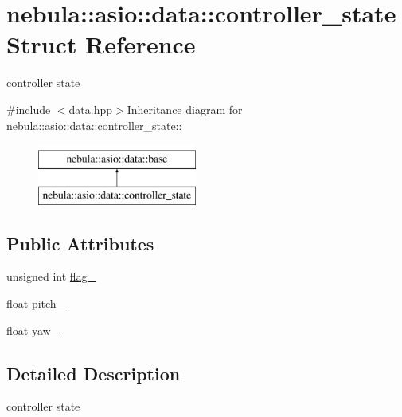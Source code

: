 \hypertarget{structnebula_1_1asio_1_1data_1_1controller__state}{
\section{nebula::asio::data::controller\_\-state Struct Reference}
\label{structnebula_1_1asio_1_1data_1_1controller__state}
}


controller state  


{\ttfamily \#include $<$data.hpp$>$}Inheritance diagram for nebula::asio::data::controller\_\-state::\begin{figure}[H]
\begin{center}
\leavevmode
\includegraphics[height=2cm]{structnebula_1_1asio_1_1data_1_1controller__state}
\end{center}
\end{figure}
\subsection*{Public Attributes}
\begin{DoxyCompactItemize}
\item 
unsigned int \hyperlink{structnebula_1_1asio_1_1data_1_1controller__state_a3198c5698b341c2b5c69448ed040df55}{flag\_\-}
\item 
float \hyperlink{structnebula_1_1asio_1_1data_1_1controller__state_a72667482c3ad17c4140e5046bf7badb8}{pitch\_\-}
\item 
float \hyperlink{structnebula_1_1asio_1_1data_1_1controller__state_abd23e8dac5a7c0cc6a764315d9e66195}{yaw\_\-}
\end{DoxyCompactItemize}


\subsection{Detailed Description}
controller state 

